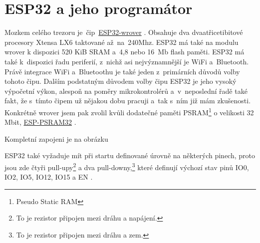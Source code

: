 \section{ESP32 a jeho programátor}


Mozkem celého trezoru je~čip~\href{https://www.espressif.com/sites/default/files/documentation/esp32-wrover-b_datasheet_en.pdf}{ESP32-wrover} \parencite{ESP32-WROVER-B}. 
Obsahuje dva dva\-a\-tři\-ce\-ti\-bi\-to\-vé procesory Xtensa LX6 taktované až~na~240Mhz. ESP32 \parencite{ESP32} má také na modulu wrover k dispozici 520 KiB SRAM 
a~4,8 nebo 16~Mb flash paměti. ESP32 má také k~dispozici řadu periferií, z~nichž asi nejvýznamnější je WiFi a~Bluetooth. Právě integrace 
WiFi a~Bluetoothu je také jeden z~primárních důvodů volby tohoto čipu. Dalším podstatným důvodem volby čipu ESP32 je jeho vysoký výpočetní výkon, 
alespoň na poměry mikrokontrolérů a~v~neposlední řadě také fakt, že s~tímto čipem už nějakou dobu pracuji a~tak s~ním již mám zkušenosti. 
Konkrétně wrover jsem pak zvolil kvůli dodatečné paměti PSRAM\footnote{Pseudo Static RAM} o velikosti 32 Mbit, 
\href{http://gamma.spb.ru/images/pdf/esp-psram32_datasheet_en.pdf}{ESP-PSRAM32} \parencite{ESP-PSRAM32}.

Kompletní zapojeni je na obrázku 

ESP32 také vyžaduje mít při startu definované úrovně na některých pinech, proto jsou zde čtyři pull-upy\footnote{To je rezistor připojen mezi dráhu a napájení.} 
a dva pull-downy,\footnote{To je rezistor připojen mezi dráhu a zem.} které definují výchozí stav pinů IO0, IO2, IO5, IO12, IO15 a EN \parencite{ESP32}.
\begin{table}[h]
    \centering
    \caption{Popis funkce pinů}
    \label{tab:COMPARATION}
\end{table}

